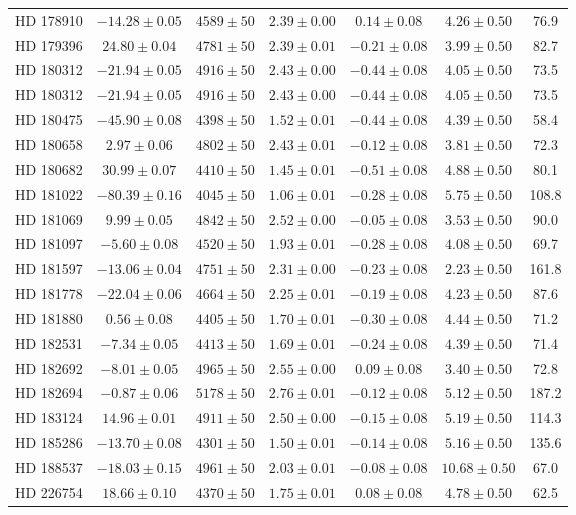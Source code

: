 \begin{table*}
\begin{tabular}{ccccccc}
HD 178910 & $-14.28 \pm 0.05$ & $4589 \pm 50$ & $2.39 \pm 0.00$ & $0.14 \pm 0.08$ & $4.26 \pm 0.50$ & 76.9 \\
HD 179396 & $24.80 \pm 0.04$ & $4781 \pm 50$ & $2.39 \pm 0.01$ & $-0.21 \pm 0.08$ & $3.99 \pm 0.50$ & 82.7 \\
HD 180312 & $-21.94 \pm 0.05$ & $4916 \pm 50$ & $2.43 \pm 0.00$ & $-0.44 \pm 0.08$ & $4.05 \pm 0.50$ & 73.5 \\
HD 180312 & $-21.94 \pm 0.05$ & $4916 \pm 50$ & $2.43 \pm 0.00$ & $-0.44 \pm 0.08$ & $4.05 \pm 0.50$ & 73.5 \\
HD 180475 & $-45.90 \pm 0.08$ & $4398 \pm 50$ & $1.52 \pm 0.01$ & $-0.44 \pm 0.08$ & $4.39 \pm 0.50$ & 58.4 \\
HD 180658 & $2.97 \pm 0.06$ & $4802 \pm 50$ & $2.43 \pm 0.01$ & $-0.12 \pm 0.08$ & $3.81 \pm 0.50$ & 72.3 \\
HD 180682 & $30.99 \pm 0.07$ & $4410 \pm 50$ & $1.45 \pm 0.01$ & $-0.51 \pm 0.08$ & $4.88 \pm 0.50$ & 80.1 \\
HD 181022 & $-80.39 \pm 0.16$ & $4045 \pm 50$ & $1.06 \pm 0.01$ & $-0.28 \pm 0.08$ & $5.75 \pm 0.50$ & 108.8 \\
HD 181069 & $9.99 \pm 0.05$ & $4842 \pm 50$ & $2.52 \pm 0.00$ & $-0.05 \pm 0.08$ & $3.53 \pm 0.50$ & 90.0 \\
HD 181097 & $-5.60 \pm 0.08$ & $4520 \pm 50$ & $1.93 \pm 0.01$ & $-0.28 \pm 0.08$ & $4.08 \pm 0.50$ & 69.7 \\
HD 181597 & $-13.06 \pm 0.04$ & $4751 \pm 50$ & $2.31 \pm 0.00$ & $-0.23 \pm 0.08$ & $2.23 \pm 0.50$ & 161.8 \\
HD 181778 & $-22.04 \pm 0.06$ & $4664 \pm 50$ & $2.25 \pm 0.01$ & $-0.19 \pm 0.08$ & $4.23 \pm 0.50$ & 87.6 \\
HD 181880 & $0.56 \pm 0.08$ & $4405 \pm 50$ & $1.70 \pm 0.01$ & $-0.30 \pm 0.08$ & $4.44 \pm 0.50$ & 71.2 \\
HD 182531 & $-7.34 \pm 0.05$ & $4413 \pm 50$ & $1.69 \pm 0.01$ & $-0.24 \pm 0.08$ & $4.39 \pm 0.50$ & 71.4 \\
HD 182692 & $-8.01 \pm 0.05$ & $4965 \pm 50$ & $2.55 \pm 0.00$ & $0.09 \pm 0.08$ & $3.40 \pm 0.50$ & 72.8 \\
HD 182694 & $-0.87 \pm 0.06$ & $5178 \pm 50$ & $2.76 \pm 0.01$ & $-0.12 \pm 0.08$ & $5.12 \pm 0.50$ & 187.2 \\
HD 183124 & $14.96 \pm 0.01$ & $4911 \pm 50$ & $2.50 \pm 0.00$ & $-0.15 \pm 0.08$ & $5.19 \pm 0.50$ & 114.3 \\
HD 185286 & $-13.70 \pm 0.08$ & $4301 \pm 50$ & $1.50 \pm 0.01$ & $-0.14 \pm 0.08$ & $5.16 \pm 0.50$ & 135.6 \\
HD 188537 & $-18.03 \pm 0.15$ & $4961 \pm 50$ & $2.03 \pm 0.01$ & $-0.08 \pm 0.08$ & $10.68 \pm 0.50$ & 67.0 \\
HD 226754 & $18.66 \pm 0.10$ & $4370 \pm 50$ & $1.75 \pm 0.01$ & $0.08 \pm 0.08$ & $4.78 \pm 0.50$ & 62.5 \\
\hline
\end{tabular}
\end{table*}
